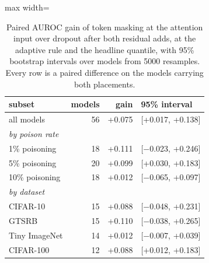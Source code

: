 \begin{table}[htbp]
\centering
\small
\caption{Paired AUROC gain of token masking at the attention input over dropout after both residual adds, at the adaptive rule and the headline quantile, with 95\% bootstrap intervals over models from 5000 resamples. Every row is a paired difference on the models carrying both placements.}
\label{tab:gains}
\begin{adjustbox}{max width=\linewidth}
\begin{tabular}{lrrl}
\toprule
subset & models & gain & 95\% interval \\
\midrule
all models & 56 & +0.075 & [+0.017, +0.138] \\
\multicolumn{4}{l}{\emph{by poison rate}} \\
1\% poisoning & 18 & +0.111 & [$-$0.023, +0.246] \\
5\% poisoning & 20 & +0.099 & [+0.030, +0.183] \\
10\% poisoning & 18 & +0.012 & [$-$0.065, +0.097] \\
\multicolumn{4}{l}{\emph{by dataset}} \\
CIFAR-10 & 15 & +0.088 & [$-$0.048, +0.231] \\
GTSRB & 15 & +0.110 & [$-$0.038, +0.265] \\
Tiny ImageNet & 14 & +0.012 & [$-$0.007, +0.039] \\
CIFAR-100 & 12 & +0.088 & [+0.012, +0.183] \\
\bottomrule
\end{tabular}
\end{adjustbox}
\end{table}
